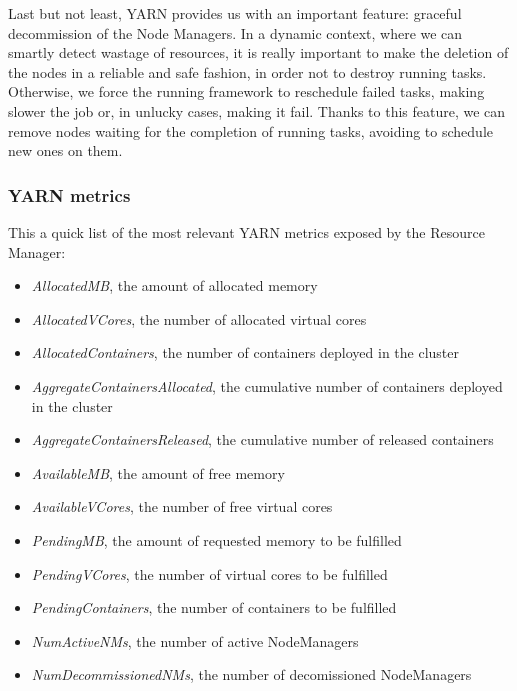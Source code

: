 \documentclass[12pt,twoside,cucitura]{toptesi}
\begin{document}
Last but not least, YARN provides us with an important feature: graceful decommission \cite{graceful_decom} of the Node Managers. In a dynamic context, where we can smartly detect wastage of resources, it is really important to make the deletion of the nodes in a reliable and safe fashion, in order not to destroy running tasks. Otherwise, we force the running framework to reschedule failed tasks, making slower the job or, in unlucky cases, making it fail. Thanks to this feature, we can remove nodes waiting for the completion of running tasks, avoiding to schedule new ones on them.   

\subsubsection{YARN metrics}
This a quick list of the most relevant YARN metrics exposed by the Resource Manager:
\begin{itemize}
  \item \textit{AllocatedMB}, the amount of allocated memory
  \item \textit{AllocatedVCores}, the number of allocated virtual cores
  \item \textit{AllocatedContainers}, the number of containers deployed in the cluster
  \item \textit{AggregateContainersAllocated}, the cumulative number of containers deployed in the cluster
  \item \textit{AggregateContainersReleased}, the cumulative number of released containers
  \item \textit{AvailableMB}, the amount of free memory
  \item \textit{AvailableVCores}, the number of free virtual cores
  \item \textit{PendingMB}, the amount of requested memory to be fulfilled
  \item \textit{PendingVCores}, the number of virtual cores to be fulfilled
  \item \textit{PendingContainers}, the number of containers to be fulfilled
  \item \textit{NumActiveNMs}, the number of active NodeManagers
  \item \textit{NumDecommissionedNMs}, the number of decomissioned NodeManagers
\end{itemize}
\end{document}
